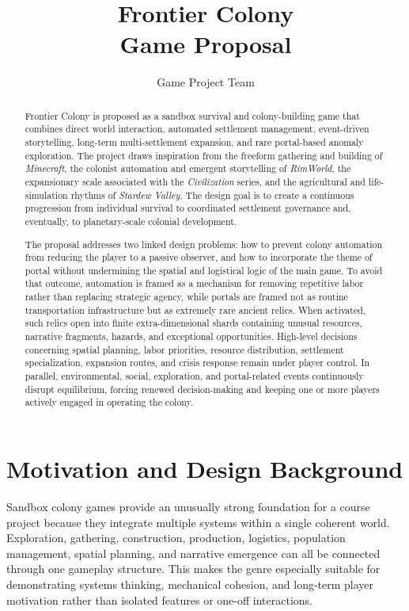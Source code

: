 \documentclass[conference]{IEEEtran}
\title{\textbf{Frontier Colony}\\Game Proposal}
\author{Game Project Team}
\begin{document}
\maketitle

\begin{abstract}
Frontier Colony is proposed as a sandbox survival and colony-building game that combines direct world interaction, automated settlement management, event-driven storytelling, long-term multi-settlement expansion, and rare portal-based anomaly exploration. The project draws inspiration from the freeform gathering and building of \textit{Minecraft}, the colonist automation and emergent storytelling of \textit{RimWorld}, the expansionary scale associated with the \textit{Civilization} series, and the agricultural and life-simulation rhythms of \textit{Stardew Valley}. The design goal is to create a continuous progression from individual survival to coordinated settlement governance and, eventually, to planetary-scale colonial development.

The proposal addresses two linked design problems: how to prevent colony automation from reducing the player to a passive observer, and how to incorporate the theme of portal without undermining the spatial and logistical logic of the main game. To avoid that outcome, automation is framed as a mechanism for removing repetitive labor rather than replacing strategic agency, while portals are framed not as routine transportation infrastructure but as extremely rare ancient relics. When activated, such relics open into finite extra-dimensional shards containing unusual resources, narrative fragments, hazards, and exceptional opportunities. High-level decisions concerning spatial planning, labor priorities, resource distribution, settlement specialization, expansion routes, and crisis response remain under player control. In parallel, environmental, social, exploration, and portal-related events continuously disrupt equilibrium, forcing renewed decision-making and keeping one or more players actively engaged in operating the colony.
\end{abstract}

\section{Motivation and Design Background}
Sandbox colony games provide an unusually strong foundation for a course project because they integrate multiple systems within a single coherent world. Exploration, gathering, construction, production, logistics, population management, spatial planning, and narrative emergence can all be connected through one gameplay structure. This makes the genre especially suitable for demonstrating systems thinking, mechanical cohesion, and long-term player motivation rather than isolated features or one-off interactions.
\end{document}

